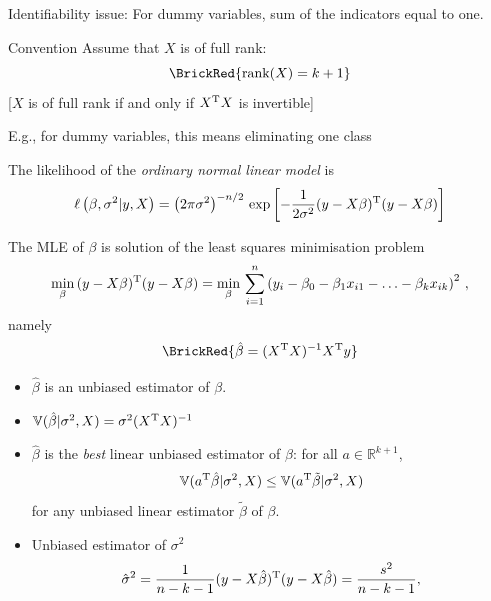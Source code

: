 \begin{slide}
Identifiability issue: For dummy variables, sum of the indicators equal to one.


\begin{block}{Convention}
Assume that $X$ is of full rank:
$$\BrickRed{
\mbox{rank}(X)=k+1
}$$
[$X$ is of full rank if and only if $X^{\mathrm{T}} X$ is invertible]
\end{block}

\pause
\begin{flushright} E.g., for dummy variables, this means eliminating one class \end{flushright}

\end{slide}\begin{slide}

The likelihood of the \textit{ordinary normal linear model} is
$$
\ell\left(\beta,\sigma^2|y,X\right)=\left(2\pi\sigma^2\right)^{-n/2}\,
\exp\left[-\frac{1}{2\sigma^2}(y-X\beta)^{\mathrm{T}} (y-X\beta)\right]
$$

\pause\vs The MLE of $\beta$ is solution of the least squares minimisation problem
\small
$$
\min_\beta\, (y-X\beta)^{\mathrm{T}} (y-X\beta) = \min_\beta
\,\sum_{i=1}^n\left(y_i-\beta_0-\beta_1x_{i1}-\ldots-\beta_kx_{ik}\right)^2\,,
$$
\normalsize
namely
$$\BrickRed{
\hat\beta=(X^\tee X)^{-1}X^\tee y
}$$

\end{slide}\begin{slide}
\begin{itemize}
\item $\hat\beta$ is an unbiased estimator of $\beta$.

\item $\mathbb{V}(\hat\beta|\sigma^2,X)=\sigma^2(X^{\mathrm{T}} X)^{-1}$

\item $\hat\beta$ is the {\em best} linear unbiased estimator of $\beta$: 
for all $a\in\mathbb{R}^{k+1}$, 
$$
\mathbb{V}(a^{\mathrm{T}}\hat\beta|\sigma^2,X)\leq\mathbb{V} (a^{\mathrm{T}}\tilde\beta|\sigma^2,X)
$$
for any unbiased linear estimator $\tilde\beta$ of $\beta$.

\item Unbiased estimator of $\sigma^2$
$$
\hat\sigma^2=\frac{1}{n-k-1}(y-X\hat\beta)^{\mathrm{T}} (y-X\hat\beta)=\frac{s^2}{n-k-1},
$$
\end{itemize}

\end{slide}
